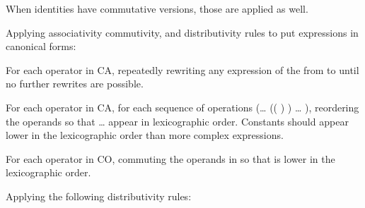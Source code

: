 \begin{compactenum}
\begin{compactenum}
    When identities have commutative versions, those are applied as
    well.
  \end{compactenum}
\item
  Applying associativity commutivity, and distributivity rules to put
  expressions in canonical forms:
\begin{compactenum}
\item
  For each operator  in CA, repeatedly rewriting any expression
  of the from   \code{(} 
  \code{)} to \code{(} 
  \code{)}   until no further rewrites are
  possible.
\item
  For each operator  in CA, for each sequence of operations
  (\ldots{} ((  )  )
  \ldots{}  ), reordering the operands so that
   \ldots{}  appear in lexicographic order. Constants
  should appear lower in the lexicographic order than more complex
  expressions.
\item
  For each operator  in CO, commuting the operands in 
    so that  is lower in the lexicographic
  order.
\item
  Applying the following distributivity rules:


\end{compactenum}
\end{compactenum}

